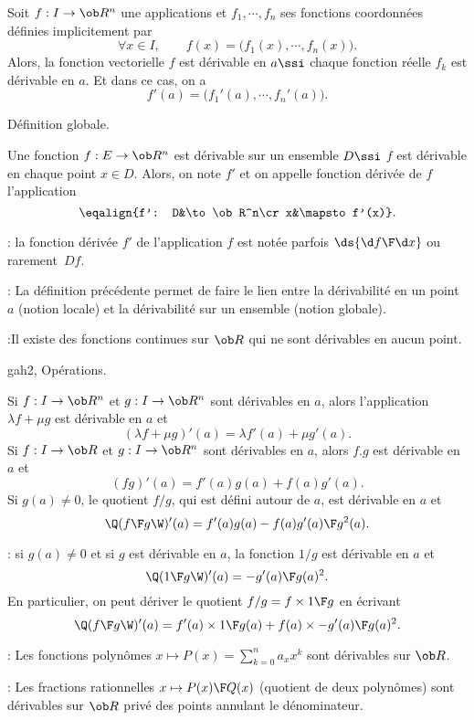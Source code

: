 Soit $f:I\to\ob R^n$ une applications et $f_1, \cdots, f_n$ ses fonctions coordonnées définies implicitement par  
$$
\forall x\in I,\qquad f(x)=\Big(f_1(x),\cdots, f_n(x)\Big).
$$
Alors, la fonction vectorielle $f$ est dérivable en $a\ssi$ chaque fonction réelle $f_k$ est dé\-ri\-va\-ble en $a$. 
Et dans ce cas, on a 
$$
f'(a)=\Big(f_1'(a),\cdots, f_n'(a)\Big).
$$

\Concept Définition globale. 

Une fonction $f:E\to\ob R^n$ est dérivable sur un ensemble $D\ssi$ $f$ est dérivable en chaque point $x\in D$. 
Alors, on note $f'$ et on appelle fonction dérivée de $f$ l'application 
$$
\eqalign{f': D&\to\ob R^n\cr x&\mapsto f'(x)}.
$$ 

: la fonction dérivée $f'$ de l'application $f$ est notée parfois $\ds {\d f\F \d x}$ ou rarement~$Df$. 
\bigskip

: La définition précédente permet de faire le lien entre la dérivabilité en un point $a$ (notion locale) et la dérivabilité sur un ensemble (notion globale). 
\bigskip

:Il existe des fonctions continues sur $\ob R$ qui ne sont dérivables en aucun point. 

\Subsection gah2, Opérations. 

Si $f:I\to\ob R^n$ et $g:I\to\ob R^n$ sont dérivables en $a$, alors l'application $\lambda f+\mu g$ est dérivable en $a$ et 
$$
(\lambda f+\mu g)'(a)=\lambda f'(a)+\mu g'(a). 
$$
Si $f:I\to\ob R$ et $g:I\to\ob R^n$ sont dérivables en $a$, alors $f.g$ est dérivable en $a$ et
$$
(fg)'(a)=f'(a)g(a)+f(a)g'(a).
$$
Si $g(a)\neq 0$, le quotient $f/g$, qui est défini autour de $a$, est dérivable en $a$ et 
$$
\Q({f\F g}\W)'(a)={f'(a)g(a)-f(a)g'(a)\F g^2(a)}.
$$

\Remarque : si $g(a)\neq0$ et si $g$ est dérivable en $a$, la fonction $1/g$ est dérivable en $a$ et 
$$
\Q({1\F g}\W)'(a)=-{g'(a)\F g(a)^2}.
$$
En particulier, on peut dériver le quotient $f/g=f\times{1\F g}$ en écrivant 
$$
\Q({f\F g}\W)'(a)=f'(a)\times {1\F g(a)}+f(a)\times{-g'(a)\F g(a)^2}.
$$

\Remarque : Les fonctions polynômes $x\mapsto P(x)=\sum_{k=0}^n a_xx^k$ sont dérivables sur $\ob R$. 
\bigskip

\Remarque  : Les fractions rationnelles $x\mapsto {P(x)\F Q(x)}$ (quotient de deux polynômes) sont dérivables sur $\ob R$ privé des points annulant le dénominateur. 
\bigskip


